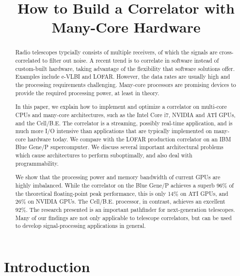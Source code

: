 \documentclass{article}
\title{How to Build a Correlator with Many-Core Hardware}
\begin{document}
\maketitle

\begin{abstract}
Radio telescopes typcially consists of multiple receivers, of which the signals
are cross-correlated to filter out noise.
A recent trend is to correlate in software instead of custom-built hardware,
taking advantage of the flexibility that software solutions offer.
Examples include e-VLBI and LOFAR.
However, the data rates are usually high and the processing requirements
challenging.
Many-core processors are promising devices to provide the required processing
power, at least in theory.

In this paper, we explain how to implement and optimize a correlator on
multi-core CPUs and many-core architectures, such as the Intel Core i7, NVIDIA and ATI GPUs,
and the \mbox{Cell/B.E.}  The correlator is a streaming, possibly real-time
application, and is much more I/O intensive than applications that are
typically implemented on many-core hardware today.  We compare with
the LOFAR production correlator on an IBM Blue Gene/P supercomputer.
We discuss several important architectural problems which cause
architectures to perform suboptimally, and also deal with programmability. 

We show that the processing power and memory bandwidth of
current GPUs are highly imbalanced.  While
the correlator on the Blue Gene/P achieves a superb 96\% of the
theoretical floating-point peak performance, this is only 14\% on ATI GPUs,
and 26\% on NVIDIA GPUs.
The \mbox{Cell/B.E.} processor, in contrast, achieves an
excellent 92\%.
The research presented is an important pathfinder for next-generation
telescopes.
Many of our findings are not only applicable to telescope correlators, but can
be used to develop signal-processing applications in general.
\end{abstract}


\section{Introduction}

\end{document}
